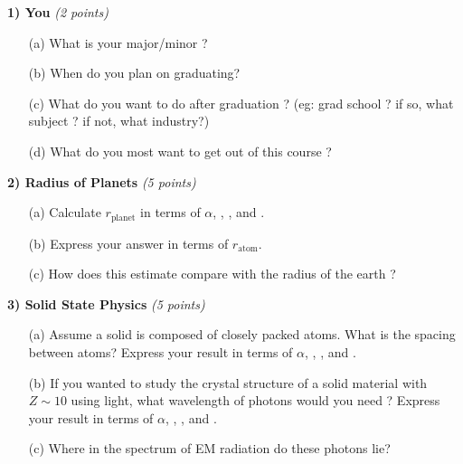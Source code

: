 {\large
\textbf{1) You} \hfill \textit{(2 points)}
\begin{itemize}
\item[(a)]What is your major/minor ? 
\item[(b)]When do you plan on graduating?
\item[(c)]What do you want to do after graduation ? (eg: grad school ? if so, what subject ? if not, what industry?)
\item[(d)]What do you most want to get out of this course ? 
\end{itemize}

\vspace*{0.25in}

\textbf{2) Radius of Planets} \hfill \textit{(5 points)}
\begin{itemize}
\item[(a)] Calculate $r_{\textrm{planet}}$ in terms of $\alpha$, \aG, \mp, and \me. 
\item[(b)] Express your answer in terms of $r_{\textrm{atom}}$.
\item[(c)] How does this estimate compare with the radius of the earth ? 
\end{itemize}

\vspace*{0.25in}

%

\textbf{3) Solid State Physics} \hfill \textit{(5 points)}
\begin{itemize}
\item[(a)] Assume a solid is composed of closely packed atoms. What is the spacing between atoms?  Express your result in terms of  $\alpha$, \aG, \mp, and \me.
\item[(b)] If you wanted to study the crystal structure of a solid material with $Z\sim10$ using light, what wavelength of photons would you need ?
Express your result in terms of  $\alpha$, \aG, \mp, and \me.
\item[(c)] Where in the spectrum of EM radiation do these photons lie?
\end{itemize}

}
